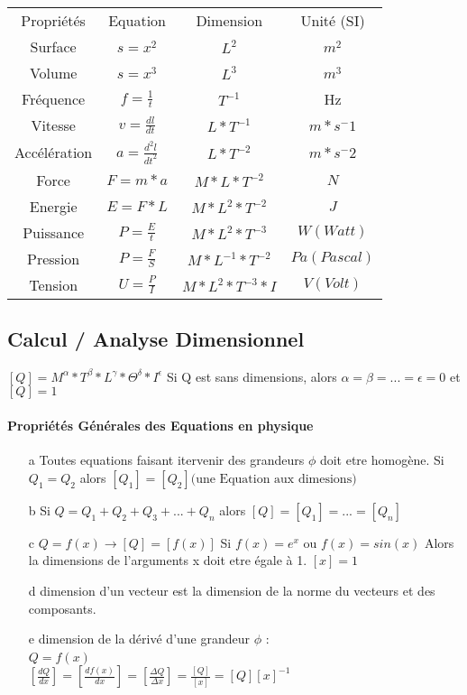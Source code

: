 \begin{tabular}{|c|c|c|c|}
	Propriétés & Equation & Dimension & Unité (SI) \\
	Surface & $s=x^2$ &$ L^2$ & $m^2$\\
	Volume & $s=x^3$ &$ L^3$ & $m^3$\\
	Fréquence & $f=\frac{1}{t}$ & $T^{-1}$ & Hz \\
	Vitesse & $v=\frac{dl}{dt}$ & $L*T^{-1}$ & $m*s^-1$ \\
	Accélération& $a=\frac{d^2l}{dt^2}$ & $L*T^{-2}$ & $m*s^-2$ \\
	Force & $F=m*a$ & $M*L*T^{-2}$ & $N$ \\
	Energie & $E=F*L$ & $M*L^2*T^{-2}$ & $J$ \\
	Puissance & $P=\frac{E}{t}$ & $M*L^2*T^{-3}$ & $W (Watt)$ \\
	Pression & $P=\frac{F}{S}$ & $M*L^{-1}*T^{-2}$ & $Pa (Pascal)$ \\
	Tension & $U=\frac{P}{I}$ & $M*L^2*T^{-3}*I$ & $V (Volt)$
\end{tabular}

\subsection{Calcul / Analyse Dimensionnel}
$[Q] = M^\alpha * T^\beta * L^\gamma * \Theta^\delta * I^\epsilon$
Si Q est sans dimensions, alors $\alpha = \beta =...=\epsilon=0$ et 
$[Q]=1$

\paragraph{Propriétés Générales des Equations en physique}
\begin{itemize}
	\item[a] Toutes equations faisant itervenir des grandeurs $\phi$ doit etre homogène.
		Si $Q_1 = Q_2$ alors $[Q_1] = [Q_2] \text{(une Equation aux dimesions)}$
	\item[b] Si $Q=Q_1 + Q_2 + Q_3 + ... + Q_n$ alors $[Q]=[Q_1]=...=[Q_n]$
	\item[c] $Q = f(x) \rightarrow [Q] = [f(x)]$
		Si $f(x) = e^x$ ou  $f(x) = sin(x)$ Alors la dimensions de l'arguments x doit etre égale à 1. $[x] = 1$
	\item[d] dimension d'un vecteur est la dimension de la norme du vecteurs et des composants.
	\item[e] dimension de la dérivé d'une grandeur $\phi$ : ~\\
		$Q=f(x)$ ~\\
		$[\frac{dQ}{dx}] = [\frac{df(x)}{dx}]=[\frac{\Delta Q}{\Delta x}] = \frac{[Q]}{[x]} = [Q][x]^{-1}$
\end{itemize}

